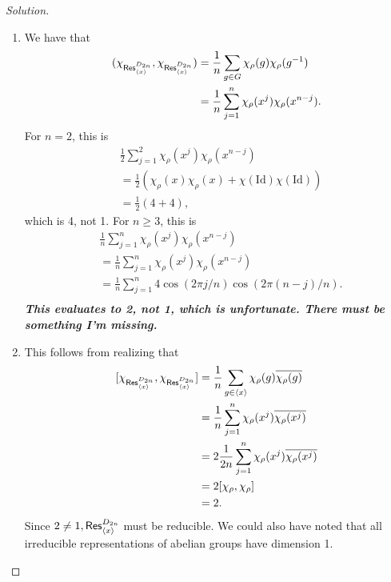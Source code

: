 \begin{proof}[Solution]
\begin{enumerate}[font=\normalfont,label=\textbf{(\alph*)}, wide]
\item We have that
\[
\begin{aligned}
(\chi_{\mathsf{Res}^{D_{2n}}_{\langle x\rangle}}, \chi_{\mathsf{Res}^{D_{2n}}_{\langle x\rangle}})
&= \frac{1}{n}\sum_{g \in G} \chi_{\rho}(g) \chi_{\rho}(g^{-1}) \\
&= \frac{1}{n}\sum_{j = 1}^{n} \chi_{\rho}(x^j) \chi_{\rho}(x^{n-j}).
\end{aligned}
\]
For $n = 2$, this is
\[
\begin{aligned}
&\frac{1}{2}\sum_{j = 1}^{2} \chi_{\rho}(x^j) \chi_{\rho}(x^{n-j}) \\
&= \frac{1}{2}(\chi_{\rho}(x) \chi_{\rho}(x) + \chi(\text{Id})\chi(\text{Id})) \\
&= \frac{1}{2}(4 + 4),
\end{aligned}
\]
which is 4, not 1. For $n \geq 3$, this is
\[
\begin{aligned}
&\frac{1}{n}\sum_{j = 1}^{n} \chi_{\rho}(x^j) \chi_{\rho}(x^{n-j}) \\
&= \frac{1}{n}\sum_{j=1}^n \chi_{\rho}(x^j) \chi_{\rho}(x^{n-j}) \\
&= \frac{1}{n}\sum_{j=1}^n 4\cos(2\pi j/n)\cos(2\pi (n-j)/n). \\
\end{aligned}
\]
\textbf{\emph{This evaluates to 2, not 1, which is unfortunate. There must be something I'm missing.}}

\item This follows from realizing that
\[
\begin{aligned}
[\chi_{\Res}, \chi_{\Res}]
&=  \frac{1}{n}\sum_{g \in \langle x \rangle}  \chi_\rho(g)\overline{\chi_\rho(g)} \\
&= \frac{1}{n}\sum_{j = 1}^n  \chi_\rho(x^j)\overline{\chi_\rho(x^j)} \\
&= 2\frac{1}{2n}\sum_{j = 1}^n  \chi_\rho(x^j)\overline{\chi_\rho(x^j)} \\
&= 2[\chi_\rho, \chi_\rho] \\
&= 2.
\end{aligned}
\]
Since $2 \neq 1, \mathsf{Res}^{D_{2n}}_{\langle x\rangle}$ must be reducible. We could also have noted that all irreducible representations of abelian groups have dimension 1.
\end{enumerate}
\end{proof}

\newpage



